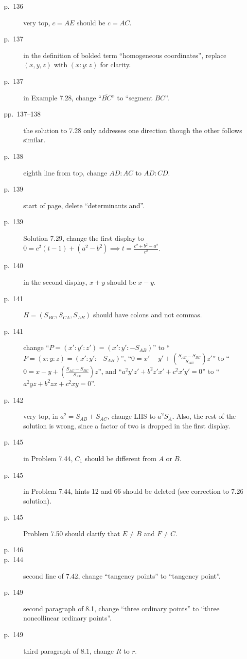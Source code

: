 \documentclass[11pt]{scrartcl}
\begin{document}
\begin{description}
\item[p.\  136] very top, $c=AE$ should be $c=AC$.
\item[p.\  137] in the definition of bolded term ``homogeneous coordinates'',
  replace $(x,y,z)$ with $(x:y:z)$ for clarity.
\item[p.\  137] in Example 7.28, change ``$\overline{BC}$'' to ``segment $BC$''.
\item[pp.\  137--138] the solution to 7.28 only addresses one direction
  though the other follows similar.
\item[p.\  138] eighth line from top, change $AD:AC$ to $AD:CD$.
\item[p.\  139] start of page, delete ``determinants and''.
\item[p.\  139] Solution 7.29, change the first display to
  $0 = c^2(t-1) + (a^2-b^2) \implies t = \frac{c^2+b^2-a^2}{c^2}$.
\item[p.\  140] in the second display, $x+y$ should be $x-y$.
\item[p.\  141] $H = (S_{BC},S_{CA},S_{AB})$ should have
  colons and not commas.
\item[p.\  141] change ``$P = \left(x' : y' : z'\right) = \left(x' : y' : -S_{AB}\right)$''
  to ``$P = \left(x : y : z\right) = \left(x' : y' : -S_{AB}\right)$'',
  ``$0 = x' - y' + \left( \frac{S_{AC}-S_{BC}}{S_{AB}} \right) z'$''
  to ``$0 = x - y + \left( \frac{S_{AC}-S_{BC}}{S_{AB}} \right) z$'',
  and ``$a^2 y'z' + b^2 z'x' + c^2 x'y' = 0$''
  to ``$a^2 yz + b^2 zx + c^2 xy = 0$''.
\item[p.\  142] very top, in $a^2=S_{AB}+S_{AC}$, change LHS to $a^2S_A$.
  Also, the rest of the solution is wrong, since a factor of two is dropped in the first display.
\item[p.\  145] in Problem 7.44, $C_1$ should be different from $A$ or $B$.
\item[p.\  145] in Problem 7.44, hints 12 and 66 should be deleted (see correction to 7.26
  solution).
\item[p.\  145] Problem 7.50 should clarify that $E \neq B$ and $F \neq C$.
\item[p.\  146] 
\item[p.\  144] second line of 7.42, change ``tangency points'' to ``tangency point''.
\item[p.\  149] second paragraph of 8.1, change ``three ordinary points''
  to ``three noncollinear ordinary points''.
\item[p.\  149] third paragraph of 8.1, change $R$ to $r$.

\end{description}
\end{document}
